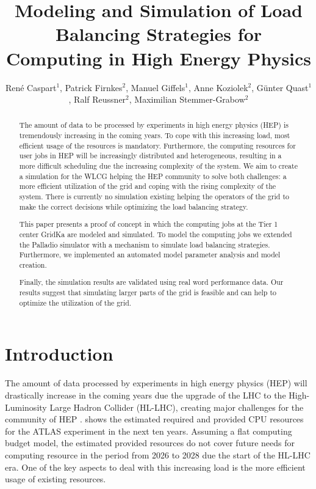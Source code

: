 \documentclass[a4paper]{jpconf}
\begin{document}
\title{Modeling and Simulation of Load Balancing Strategies for Computing in High Energy Physics}

\author{Ren\'e Caspart${}^{1}$,
	Patrick Firnkes${}^{2}$,
	Manuel Giffels${}^{1}$,
	Anne Koziolek${}^{2}$,
	G\"unter Quast${}^{1}$,
	Ralf Reussner${}^{2}$, 
	Maximilian Stemmer-Grabow${}^{2}$}

\address{
	${}^{1}$Institute for Experimental Particle Physics (ETP) \\
	${}^{2}$Institute for Program Structures and Data Organization (IPD) \\
	at Karlsruhe Institute of Technology (KIT), Karlsruhe, Germany}


\begin{abstract}
	The amount of data to be processed by experiments in high energy physics (HEP) is tremendously increasing in the coming years. To cope with this increasing load, most efficient usage of the resources is mandatory. Furthermore, the computing resources for user jobs in HEP will be increasingly distributed and heterogeneous, resulting in a more difficult scheduling due the increasing complexity of the system. 
	We aim to create a simulation for the WLCG helping the HEP community to solve both challenges: a more efficient utilization of the grid and coping with the rising complexity of the system.
	There is currently no simulation existing helping the operators of the grid to make the correct decisions while optimizing the load balancing strategy.
	
	This paper presents a proof of concept in which the computing jobs at the Tier 1 center GridKa are modeled and simulated. To model the computing jobs we extended the Palladio simulator with a mechanism to simulate load balancing strategies. Furthermore, we implemented an automated model parameter analysis and model creation.
	
	Finally, the simulation results are validated using real word performance data. Our results suggest that simulating larger parts of the grid is feasible and can help to optimize the utilization of the grid.
\end{abstract}


\section{Introduction}
\label{sec:intro}

The amount of data processed by experiments in high energy physics (HEP) will drastically increase in the coming years due the upgrade of the LHC to the High-Luminosity Large Hadron Collider (HL-LHC), creating major challenges for the community of HEP \cite{community}.
 shows the estimated required and provided CPU resources for the ATLAS experiment in the next ten years. Assuming a flat computing budget model, the estimated provided resources do not cover future needs for computing resource in the period from 2026 to 2028 due the start of the HL-LHC era. One of the key aspects to deal with this increasing load is the more efficient usage of existing resources.
\end{document}
